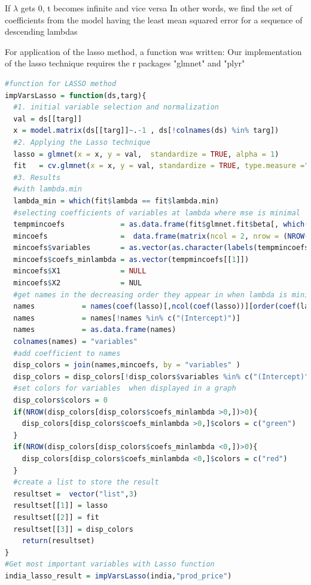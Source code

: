 \documentclass[12pt,a4paper,english]{article}
\begin{document}
If $\lambda$ gets 0, t becomes infinite and vice versa
In other words, we find the set of coefficients from the model having the least mean squared error for  a sequence of descending lambdas

For application of the lasso method, a function was written:
Our implementation of the lasso technique requires the r packages "glmnet" and "plyr"

\begin{lstlisting}[language= R, captionpos=b,caption=\href{https://github.com/jaidikam/sps_ws1718/tree/master/Qfolder4}{SPL\_Q4\_india\_impvar\_lasso}]
#function for LASSO method   
impVarsLasso = function(ds,targ){
  #1. initial variable selection and normalization
  val = ds[[targ]]
  x = model.matrix(ds[[targ]]~.-1 , ds[!colnames(ds) %in% targ])
  #2. Applying the Lasso technique
  lasso = glmnet(x = x, y = val,  standardize = TRUE, alpha = 1)
  fit   = cv.glmnet(x = x, y = val, standardize = TRUE, type.measure ="mse", alpha=1, nfolds=3) 
  #3. Results
  #with lambda.min
  lambda_min = which(fit$lambda == fit$lambda.min) 
  #selecting coefficients of variables at lambda where mse is minimal
  tempmincoefs             = as.data.frame(fit$glmnet.fit$beta[, which(fit$lambda == fit$lambda.min)])
  mincoefs                 =  data.frame(matrix(ncol = 2, nrow = (NROW(tempmincoefs))))
  mincoefs$variables       = as.vector(as.character(labels(tempmincoefs)[[1]]))
  mincoefs$coefs_minlambda = as.vector(tempmincoefs[[1]])
  mincoefs$X1              = NULL
  mincoefs$X2              = NUL 
  #get names in the decreasing order they appear in when lambda is minimal
  names           = names(coef(lasso)[,ncol(coef(lasso))][order(coef(lasso)[,ncol(coef(lasso))],decreasing=TRUE)])
  names           = names[!names %in% c("(Intercept)")]
  names           = as.data.frame(names)
  colnames(names) = "variables" 
  #add coefficient to names
  disp_colors = join(names,mincoefs, by = "variables" )
  disp_colors = disp_colors[!disp_colors$variables %in% c("(Intercept)"),] 
  #set colors for variables  when displayed in a graph
  disp_colors$colors = 0
  if(NROW(disp_colors[disp_colors$coefs_minlambda >0,])>0){
    disp_colors[disp_colors$coefs_minlambda >0,]$colors = c("green")
  }
  if(NROW(disp_colors[disp_colors$coefs_minlambda <0,])>0){
    disp_colors[disp_colors$coefs_minlambda <0,]$colors = c("red")
  }  
  #create a list to store the result
  resultset =  vector("list",3)
  resultset[[1]] = lasso
  resultset[[2]] = fit
  resultset[[3]] = disp_colors
    return(resultset)
}
#Get most important variables with Lasso function
india_lasso_result = impVarsLasso(india,"prod_price")
\end{lstlisting}
\end{document}
